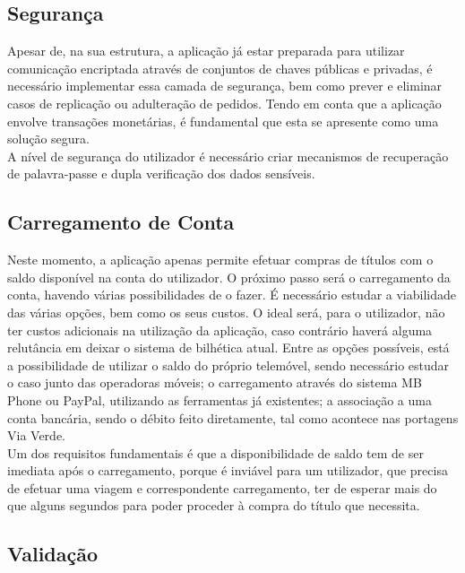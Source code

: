 \subsection{Segurança}

Apesar de, na sua estrutura, a aplicação já estar preparada para utilizar comunicação encriptada através de conjuntos de chaves públicas e privadas, é necessário implementar essa camada de segurança, bem como prever e eliminar casos de replicação ou adulteração de pedidos. Tendo em conta que a aplicação envolve transações monetárias, é fundamental que esta se apresente como uma solução segura.
\\A nível de segurança do utilizador é necessário criar mecanismos de recuperação de palavra-passe e dupla verificação dos dados sensíveis.

\subsection{Carregamento de Conta}

Neste momento, a aplicação apenas permite efetuar compras de títulos com o saldo disponível na conta do utilizador. O próximo passo será o carregamento da conta, havendo várias possibilidades de o fazer. É necessário estudar a viabilidade das várias opções, bem como os seus custos. O ideal será, para o utilizador, não ter custos adicionais na utilização da aplicação, caso contrário haverá alguma relutância em deixar o sistema de bilhética atual. Entre as opções possíveis, está a possibilidade de utilizar o saldo do próprio telemóvel, sendo necessário estudar o caso junto das operadoras móveis; o carregamento através do sistema MB Phone ou PayPal, utilizando as ferramentas já existentes; a associação a uma conta bancária, sendo o débito feito diretamente, tal como acontece nas portagens Via Verde.
\\Um dos requisitos fundamentais é que a disponibilidade de saldo tem de ser imediata após o carregamento, porque é inviável para um utilizador, que precisa de efetuar uma viagem e correspondente carregamento, ter de esperar mais do que alguns segundos para poder proceder à compra do título que necessita.

\subsection{Validação}

